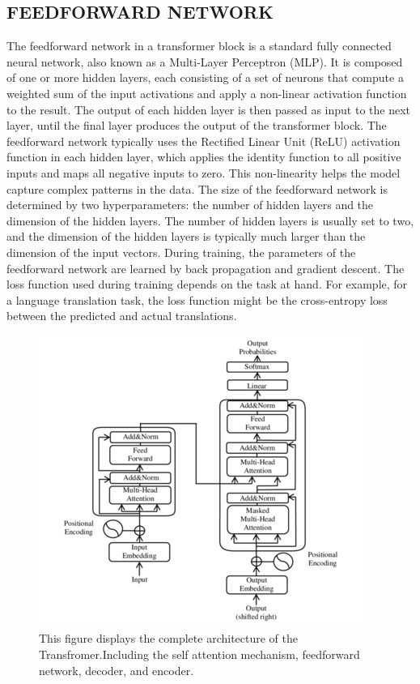 \documentclass[letterpaper, 10pt, conference]{ieeeconf}
\begin{document}
    
        
        
        \subsection{FEEDFORWARD NETWORK}
        
        The feedforward network in a transformer block is a standard fully connected neural network, also known as a Multi-Layer
        Perceptron (MLP). It is composed of one or more hidden layers, each consisting of a set of neurons that compute a weighted sum
        of the input activations and apply a non-linear activation function to the result. The output of each hidden layer is then passed as
        input to the next layer, until the final layer produces the output of the transformer block.\cite{vaswani2017}
        The feedforward network typically uses the Rectified Linear Unit (ReLU) activation function in each hidden layer, which
        applies the identity function to all positive inputs and maps all negative inputs to zero. This non-linearity helps the model capture
        complex patterns in the data.
        The size of the feedforward network is determined by two hyperparameters: the number of hidden layers and the
        dimension of the hidden layers. The number of hidden layers is usually set to two, and the dimension of the hidden layers is typically
        much larger than the dimension of the input vectors.
        During training, the parameters of the feedforward network are learned by back propagation and gradient descent. The
        loss function used during training depends on the task at hand. For example, for a language translation task, the loss function might
        be the cross-entropy loss between the predicted and actual translations.\cite{vaswani2017}

        \begin{figure}[h]
            \centering
            \includegraphics[scale=0.5]{images/transformer.png}
            \caption{This figure displays the complete architecture of the Transfromer.Including the self attention mechanism, feedforward network, decoder, and encoder.\cite{vaswani2017}}
            \label{}
         \end{figure}
\end{document}
